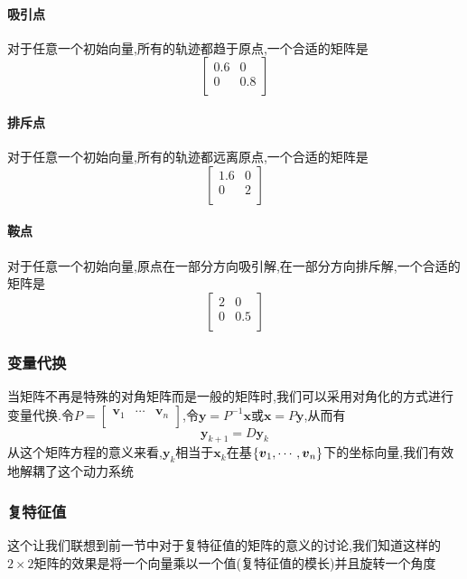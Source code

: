 \documentclass{article}
\newcommand{\ve}{\boldsymbol}
\begin{document}
\begin{CJK}{UTF8}{gkai}
\paragraph{吸引点\\}
对于任意一个初始向量,所有的轨迹都趋于原点,一个合适的矩阵是\\
\[\begin{bmatrix}
    0.6&0\\
    0&0.8\\
\end{bmatrix}\]
\paragraph{排斥点\\}
对于任意一个初始向量,所有的轨迹都远离原点,一个合适的矩阵是
\[\begin{bmatrix}
    1.6&0\\
    0&2\\
\end{bmatrix}\]
\paragraph{鞍点\\}
对于任意一个初始向量,原点在一部分方向吸引解,在一部分方向排斥解,一个合适的矩阵是\\
\[\begin{bmatrix}
    2&0\\
    0&0.5\\
\end{bmatrix}\]

\subsubsection{变量代换}
当矩阵不再是特殊的对角矩阵而是一般的矩阵时,我们可以采用对角化的方式进行变量代换.令$P = \begin{bmatrix} \ve{v}_1 &\cdots & \ve{v}_n\\ \end{bmatrix}$,令$\ve{y} = P^{-1} \ve{x}$或$\ve{x} = P \ve{y}$,从而有\\
\[ \ve{y}_{k+1} = D \ve{y}_k\]
从这个矩阵方程的意义来看,$\ve{y}_k$相当于$\ve{x}_k$在基$\{\vs{v}{1}{n}\}$下的坐标向量,我们有效地解耦了这个动力系统\\

\subsubsection{复特征值}
这个让我们联想到前一节中对于复特征值的矩阵的意义的讨论,我们知道这样的$2\times 2$矩阵的效果是将一个向量乘以一个值(复特征值的模长)并且旋转一个角度\\

\end{CJK}
\end{document}
